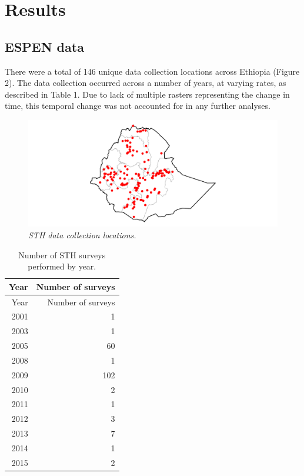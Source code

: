 \documentclass[
]{article}
\begin{document}
\hypertarget{results}{%
\section{Results}\label{results}}

\hypertarget{espen-data}{%
\subsection{ESPEN data}\label{espen-data}}

There were a total of 146 unique data collection locations across
Ethiopia (Figure 2). The data collection occurred across a number of
years, at varying rates, as described in Table 1. Due to lack of
multiple rasters representing the change in time, this temporal change
was not accounted for in any further analyses.

\begin{figure}
\centering
\includegraphics{write_up_files/figure-latex/STH_locations-1.pdf}
\caption{\textit{STH data collection locations.}}
\end{figure}

\newpage

\begin{longtable}[]{@{}rr@{}}
\caption{Number of STH surveys performed by year.}\tabularnewline
\toprule
Year & Number of surveys \\
\midrule
\endfirsthead
\toprule
Year & Number of surveys \\
\midrule
\endhead
2001 & 1 \\
2003 & 1 \\
2005 & 60 \\
2008 & 1 \\
2009 & 102 \\
2010 & 2 \\
2011 & 1 \\
2012 & 3 \\
2013 & 7 \\
2014 & 1 \\
2015 & 2 \\
\bottomrule
\end{longtable}
\end{document}
